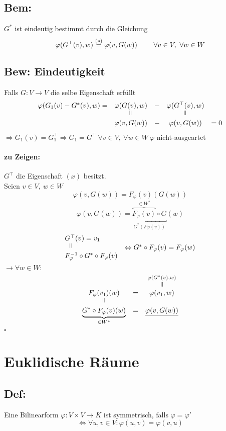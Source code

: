 \documentclass[titlepage,12pt,a4paper,ngerman]{report}
\newenvironment{bew}[1]{\subsection{Bew: #1}}{\hfill$\square$}
\newcommand{\Bew}[2]{\begin{bew}{#1}#2\end{bew}}
\newcommand{\verteq}{\rotatebox{90}{$\,=$}}
\newcommand{\equaltoup}[2]{\overset{\scriptstyle\underset{\mkern4mu\verteq}{#2}}{#1}}
\begin{document}
\subsection*{Bem:}
$G^*$ ist eindeutig bestimmt durch die Gleichung 
$$\varphi(G^\top(v),w) \buildrel (*) \over = \varphi(v,G(w))\qquad \ \forall v \in V,\ \forall w \in W$$
\Bew{Eindeutigkeit}{
	Falls $G:V\to V$ die selbe Eigenschaft erfüllt
	$$ \begin{array}{ccccc}
	\varphi(G_1(v) - G^* (v),w) = & \varphi(G(v),w) & - & \varphi (G^\top (v),w) \\
	& \verteq & &  \verteq \\
	& \varphi(v, G(w)) & - & \varphi(v,G(w)) & = 0
	\end{array}$$
	$\Rightarrow G_1(v) = G_1^\top \Rightarrow G_1=G^\top\ \forall v \in V,\ \forall w \in W\ \varphi$ nicht-ausgeartet 
	\paragraph{zu Zeigen:} $G^\top$ die Eigenschaft $(x)$ besitzt.\\
	Seien \underline{$v \in V,\ w \in W$} 
	$$\varphi(v,G(w)) = F_\varphi(v)(G(w))$$
	$$\varphi(v,G(w)) = \underbracket{\overbrace{F_\varphi(v)}^{\in W^*} \circ G}_{G^*(F\varphi(v))}(w)$$
	$$ \begin{array}{lc}
	G^\top(v)  = v_1 \\
	\ \ \verteq & \Leftrightarrow G^* \circ F_\varphi(v) = F_\varphi(w)\\
	F^{-1}_{\varphi}\circ G^* \circ F_\varphi(v)
	\end{array}$$
	$\rightarrow \forall w \in W:$
	$$\begin{array}{ccc}
	F_\varphi(v_1)(w) & = & \equaltoup{\varphi(v_1,w)}{\varphi(G^*(v),w)}\\
	\verteq \\
	\underbrace{G^* \circ F_\varphi(v)(w)}_{\in W^*} & = & \underline{\varphi(v,G(w))}
	\end{array}$$
}

\section{Euklidische Räume}
\subsection{Def:}
Eine Bilinearform $ \varphi: V \times V \to K$ ist symmetrisch, falls $ \varphi = \varphi' $ 
$$ \Leftrightarrow \forall u,v \in V : \varphi(u,v) = \varphi(v,u) $$
\end{document}
